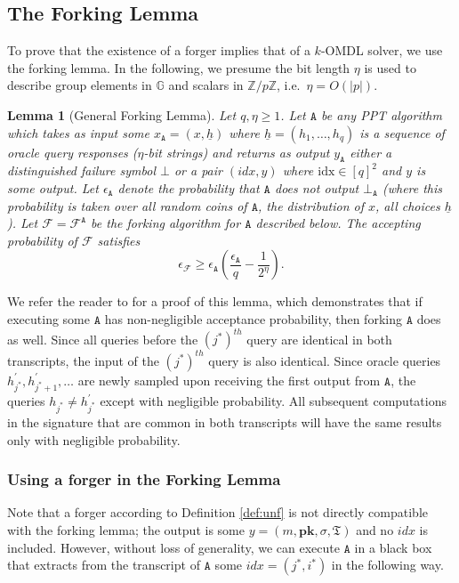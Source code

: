\documentclass{mrl}
\theoremstyle{plain}
\newtheorem{lemma}{Lemma}[section]
\theoremstyle{definition}
\begin{document}
\subsection{The Forking Lemma} To prove that the existence of a forger implies that of a $k$-OMDL solver, we use the forking lemma. In the following, we presume the bit length $\eta$ is used to describe group elements in $\mathbb{G}$ and scalars in $\mathbb{Z}/p\mathbb{Z}$, i.e.\ $\eta = O(\left|p\right|)$.

\begin{lemma}[General Forking Lemma]\label{lem:fork}
Let $q, \eta \geq 1$. Let $\texttt{A}$ be any PPT algorithm which takes as input some $x_\texttt{A} = (x, \underline{h})$ where $\underline{h} = (h_1, \ldots, h_q)$ is a sequence of oracle query responses ($\eta$-bit strings) and returns as output $y_{\texttt{A}}$ either a distinguished failure symbol $\bot$ or a pair $(\textit{idx}, y)$ where $\text{idx} \in [q]^2$ and $y$ is some output. Let $\epsilon_{\texttt{A}}$ denote the probability that $\texttt{A}$ does not output $\bot_{\texttt{A}}$ (where this probability is taken over all random coins of $\texttt{A}$, the distribution of $x$, all choices $\underline{h}$). Let $\mathcal{F} = \mathcal{F}^{\texttt{A}}$ be the forking algorithm for $\texttt{A}$ described below. The accepting probability of $\mathcal{F}$ satisfies \[\epsilon_{\mathcal{F}} \geq \epsilon_{\texttt{A}} \left(\frac{\epsilon_{\texttt{A}}}{q} - \frac{1}{2^\eta}\right).\]
\end{lemma}

We refer the reader to \cite{bellare} for a proof of this lemma, which demonstrates that if executing some $\texttt{A}$ has non-negligible acceptance probability, then forking $\texttt{A}$ does as well. Since all queries before the $(j^*)^{th}$ query are identical in both transcripts, the input of the $(j^*)^{th}$ query is also identical. Since oracle queries $h_{j^*}^{\prime}, h_{j^*+1}^{\prime}, \ldots$ are newly sampled upon receiving the first output from $\texttt{A}$, the queries $h_{j^*} \neq h_{j^*}^\prime$ except with negligible probability. All subsequent computations in the signature that are common in both transcripts will have the same results only with negligible probability. 


\subsubsection{Using a forger in the Forking Lemma}

Note that a forger according to Definition \ref{def:unf} is not directly compatible with the forking lemma; the output is some $y = (m, \textbf{pk}, \sigma, \mathfrak{T})$ and no $\textit{idx}$ is included.  However, without loss of generality, we can execute $\texttt{A}$ in a black box that extracts from the transcript of $\texttt{A}$ some $\textit{idx} = (j^*, i^*)$ in the following way. 
\end{document}
